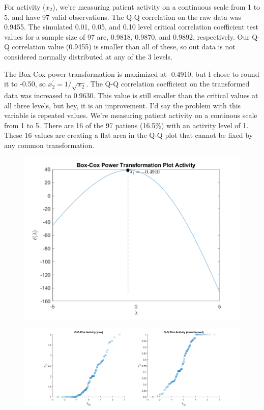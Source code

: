 For activity ($x_{2}$), we're measuring patient activity on a continuous scale from 1 to 5, and have 97 valid observations. The Q-Q correlation on the raw data was 0.9455. The simulated 0.01, 0.05, and 0.10 level critical correlation coefficient test values for a sample size of 97 are, 0.9818, 0.9870, and 0.9892, respectively. Our Q-Q correlation value (0.9455) is smaller than all of these, so out data is not considered normally distributed at any of the 3 levels.

The Box-Cox power transformation is maximized at -0.4910, but I chose to round it to -0.50, so $x_{2}^{\prime} = 1/\sqrt{x_{2}}$. The Q-Q correlation coefficient on the transformed data was increased to 0.9630. This value is still smaller than the critical values at all three levels, but hey, it is an improvement. I'd say the problem with this variable is repeated values. We're measuring patient activity on a continous scale from 1 to 5. There are 16 of the 97 patiens (16.5\%) with an activity level of 1. These 16 values are creating a flat area in the Q-Q plot that cannot be fixed by any common transformation.

\begin{center}
    \begin{figure}[H]
        \centering
        \includegraphics[scale=0.6]{./matlab/chapter-4/sol4.32.power.2.png}
    \end{figure}
\end{center}

\begin{center}
    \begin{figure}[H]
        \centering
        \includegraphics[scale=0.4]{./matlab/chapter-4/sol4.32.qq.2.png}
    \end{figure}
\end{center}

